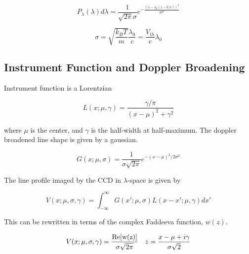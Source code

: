 \documentclass{article}
\begin{document}
\begin{equation}
P_{\lambda}(\lambda) d \lambda = \frac{1}{\sqrt{2 \pi} \sigma} e^{-\frac{\left(\lambda - \lambda_0(1 - V/c)\right)^2}{2 \sigma^2}}
\end{equation}

\begin{equation}
\sigma = \sqrt{\frac{k_B T}{m}} \frac{\lambda_0}{c} = \frac{V_{th}}{c} \lambda_0
\end{equation}

\subsection{Instrument Function and Doppler Broadening}

Instrument function is a Lorentzian

\begin{equation}
L(x;\mu,\gamma) = \frac{\gamma / \pi}{(x-\mu)^2 + \gamma^2}
\end{equation}

where $\mu$ is the center, and $\gamma$ is the half-width at half-maximum.  The doppler broadened line shape is given by a gaussian.

\begin{equation}
G(x;\mu, \sigma) = \frac{1}{\sigma \sqrt{2 \pi}} e^{-(x-\mu)^2 / 2 \sigma^2}
\end{equation}

The line profile imaged by the CCD in $\lambda$-space is given by

\begin{equation}
V(x;\mu,\sigma,\gamma) = \int_{-\infty}^{\infty} G(x';\mu,\sigma) L(x-x';\mu,\gamma) dx' 
\end{equation}

This can be rewritten in terms of the complex Faddeeva function, $w(z)$.

\begin{equation}
 V(x;\mu,\sigma,\gamma) = \frac{\rm{Re}[w(z)]}{\sigma \sqrt{2 \pi}} \quad z=\frac{x - \mu + i \gamma}{\sigma \sqrt{2}}
\end{equation} 
\end{document}
